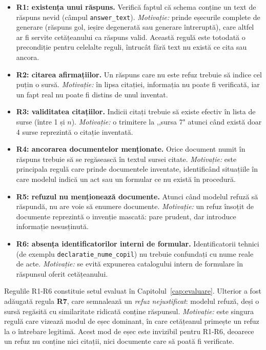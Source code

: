 \begin{itemize}
    \item \textbf{R1: existența unui răspuns.} Verifică faptul că schema conține un text de răspuns nevid (câmpul \texttt{answer\_text}). \emph{Motivație:} prinde eșecurile complete de generare (răspuns gol, ieșire degenerată sau generare întreruptă), care altfel ar fi servite cetățeanului ca răspuns valid. Această regulă este totodată o precondiție pentru celelalte reguli, întrucât fără text nu există ce cita sau ancora.
    \item \textbf{R2: citarea afirmațiilor.} Un răspuns care nu este refuz trebuie să indice cel puțin o sursă. \emph{Motivație:} în lipsa citației, informația nu poate fi verificată, iar un fapt real nu poate fi distins de unul inventat.
    \item \textbf{R3: validitatea citațiilor.} Indicii citați trebuie să existe efectiv în lista de surse (între 1 și $n$). \emph{Motivație:} o trimitere la ,,sursa 7" atunci când există doar 4 surse reprezintă o citație inventată.
    \item \textbf{R4: ancorarea documentelor menționate.} Orice document numit în răspuns trebuie să se regăsească în textul sursei citate. \emph{Motivație:} este principala regulă care prinde documentele inventate, identificând situațiile în care modelul indică un act sau un formular ce nu există în procedură.
    \item \textbf{R5: refuzul nu menționează documente.} Atunci când modelul refuză să răspundă, nu are voie să enumere documente. \emph{Motivație:} un refuz însoțit de documente reprezintă o invenție mascată: pare prudent, dar introduce informație nesusținută.
    \item \textbf{R6: absența identificatorilor interni de formular.} Identificatorii tehnici (de exemplu \texttt{declaratie\_nume\_copil}) nu trebuie confundați cu nume reale de acte. \emph{Motivație:} se evită expunerea catalogului intern de formulare în răspunsul oferit cetățeanului.
\end{itemize}

Regulile R1-R6 constituie setul evaluat în Capitolul~\ref{cap:evaluare}. Ulterior a fost adăugată regula \textbf{R7}, care semnalează un \emph{refuz nejustificat}: modelul refuză, deși o sursă regăsită cu similaritate ridicată conține răspunsul. \emph{Motivație:} este singura regulă care vizează modul de eșec dominant, în care cetățeanul primește un refuz la o întrebare legitimă. Acest mod de eșec este invizibil pentru R1-R6, deoarece un refuz nu conține nici citații, nici documente care să poată fi verificate.

